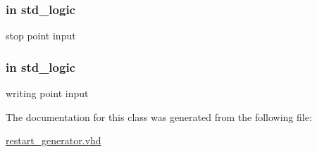 \subsubsection[{\texorpdfstring{stop\+\_\+point}{stop_point}}]{ {\bfseries \textcolor{vhdlchar}{in}\textcolor{vhdlchar}{ }} {\bfseries \textcolor{vhdlchar}{std\+\_\+logic}\textcolor{vhdlchar}{ }} \hspace{0.3cm}{\ttfamily [Port]}}\hypertarget{classrestart__generator_ae5b5aaf8947a9de595b67e0f57b9e9a3}{}\label{classrestart__generator_ae5b5aaf8947a9de595b67e0f57b9e9a3}


stop point input 

\subsubsection[{\texorpdfstring{writing\+\_\+point}{writing_point}}]{ {\bfseries \textcolor{vhdlchar}{in}\textcolor{vhdlchar}{ }} {\bfseries \textcolor{vhdlchar}{std\+\_\+logic}\textcolor{vhdlchar}{ }} \hspace{0.3cm}{\ttfamily [Port]}}\hypertarget{classrestart__generator_a12d6c9c482b5975efc30e34bb0951659}{}\label{classrestart__generator_a12d6c9c482b5975efc30e34bb0951659}


writing point input 



The documentation for this class was generated from the following file\+:\begin{DoxyCompactItemize}
\item 
\hyperlink{restart__generator_8vhd}{restart\+\_\+generator.\+vhd}\end{DoxyCompactItemize}
